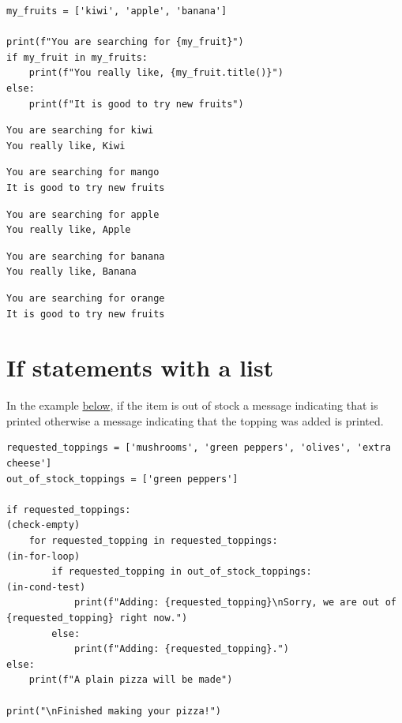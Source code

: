 \documentclass[10pt]{book}
\begin{document}
\begin{enumerate}
\begin{verbatim}
my_fruits = ['kiwi', 'apple', 'banana']

print(f"You are searching for {my_fruit}")
if my_fruit in my_fruits:
    print(f"You really like, {my_fruit.title()}")
else:
    print(f"It is good to try new fruits")    
\end{verbatim}

\label{orgf90311e}
\begin{verbatim}
You are searching for kiwi
You really like, Kiwi
\end{verbatim}

\label{org03091fc}
\begin{verbatim}
You are searching for mango
It is good to try new fruits
\end{verbatim}

\label{org798b3cd}
\begin{verbatim}
You are searching for apple
You really like, Apple
\end{verbatim}

\label{org15a8e96}
\begin{verbatim}
You are searching for banana
You really like, Banana
\end{verbatim}

\label{org2631b4d}
\begin{verbatim}
You are searching for orange
It is good to try new fruits
\end{verbatim}
\end{enumerate}
\section{If statements with a list}
\label{sec:org67dba70}
In the example \hyperref[orgda104d0]{below}, if the item is out of stock a message indicating that is printed otherwise a message indicating that the topping was added is printed.

\label{orgda104d0}
\begin{verbatim}
requested_toppings = ['mushrooms', 'green peppers', 'olives', 'extra cheese']
out_of_stock_toppings = ['green peppers']

if requested_toppings:                                                                                      (check-empty)
    for requested_topping in requested_toppings:                                                            (in-for-loop)
        if requested_topping in out_of_stock_toppings:                                                      (in-cond-test)
            print(f"Adding: {requested_topping}\nSorry, we are out of {requested_topping} right now.")
        else:
            print(f"Adding: {requested_topping}.")
else:
    print(f"A plain pizza will be made")

print("\nFinished making your pizza!")
\end{verbatim}
\end{document}
